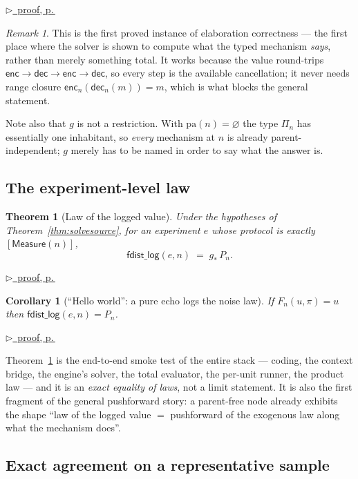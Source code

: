 \documentclass[11pt,a4paper]{article}
\theoremstyle{definition}
\theoremstyle{plain}
\newtheorem{theorem}[definition]{Theorem}
\newtheorem{corollary}[definition]{Corollary}
\theoremstyle{remark}
\newtheorem{remark}[definition]{Remark}
\newcommand{\pa}{\mathrm{pa}}
\newcommand{\pv}{\Pi}                  %
\newcommand{\enc}{\mathsf{enc}}
\newcommand{\dect}{\mathsf{dec}}
\newcommand{\push}[1]{{#1}_{*}}        %
\newcommand{\pfref}[1]{%
  \par\smallskip\noindent
  \hyperref[pf:#1]{\small$\triangleright$\ proof, p.\,\pageref{pf:#1}}\par\smallskip}
\begin{document}
\pfref{thm:solvesource}

\begin{remark}
This is the first proved instance of elaboration correctness --- the first
place where the solver is shown to compute what the typed mechanism
\emph{says}, rather than merely something total. It works because the value
round-trips $\enc \to \dect \to \enc \to \dect$, so every step is the
available cancellation; it never needs range closure
$\enc_n(\dect_n(m)) = m$, which is what blocks the general statement.

Note also that $g$ is not a restriction. With $\pa(n)=\varnothing$ the type
$\pv_n$ has essentially one inhabitant, so \emph{every} mechanism at $n$ is
already parent-independent; $g$ merely has to be named in order to say what
the answer is.
\end{remark}

\subsection{The experiment-level law}

\begin{theorem}[Law of the logged value]
\label{thm:law}
Under the hypotheses of Theorem~\ref{thm:solvesource}, for an experiment
$e$ whose protocol is exactly $[\mathsf{Measure}(n)]$,
\[
  \mathsf{fdist\_log}(e,n) \;=\; \push{g}\,P_n .
\]
\end{theorem}

\pfref{thm:law}

\begin{corollary}[``Hello world'': a pure echo logs the noise law]
\label{cor:helloworld}
If $F_n(u,\pi) = u$ then $\mathsf{fdist\_log}(e,n) = P_n$.
\end{corollary}

\pfref{cor:helloworld}

Theorem~\ref{thm:law} is the end-to-end smoke test of the entire stack ---
coding, the context bridge, the engine's solver, the total evaluator, the
per-unit runner, the product law --- and it is an \emph{exact equality of
laws}, not a limit statement. It is also the first fragment of the general
pushforward story: a parent-free node already exhibits the shape ``law of
the logged value $=$ pushforward of the exogenous law along what the
mechanism does''.

\subsection{Exact agreement on a representative sample}
\end{document}
